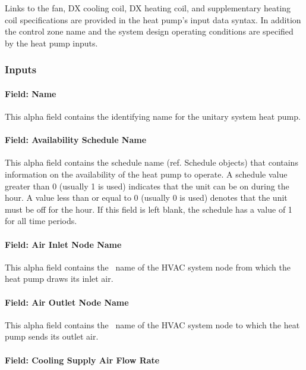 Links to the fan, DX cooling coil, DX heating coil, and supplementary heating coil specifications are provided in the heat pump's input data syntax. In addition the control zone name and the system design operating conditions are specified by the heat pump inputs.

\subsubsection{Inputs}\label{inputs-3-039}

\paragraph{Field: Name}\label{field-name-4-031}

This alpha field contains the identifying name for the unitary system heat pump.

\paragraph{Field: Availability Schedule Name}\label{field-availability-schedule-name-3-006}

This alpha field contains the schedule name (ref. Schedule objects) that contains information on the availability of the heat pump to operate. A schedule value greater than 0 (usually 1 is used) indicates that the unit can be on during the hour. A value less than or equal to 0 (usually 0 is used) denotes that the unit must be off for the hour. If this field is left blank, the schedule has a value of 1 for all time periods.

\paragraph{Field: Air Inlet Node Name}\label{field-air-inlet-node-name-007}

This alpha field contains the~ name of the HVAC system node from which the heat pump draws its inlet air.

\paragraph{Field: Air Outlet Node Name}\label{field-air-outlet-node-name-006}

This alpha field contains the~ name of the HVAC system node to which the heat pump sends its outlet air.

\paragraph{Field: Cooling Supply Air Flow Rate}\label{field-cooling-supply-air-flow-rate-3-000}

